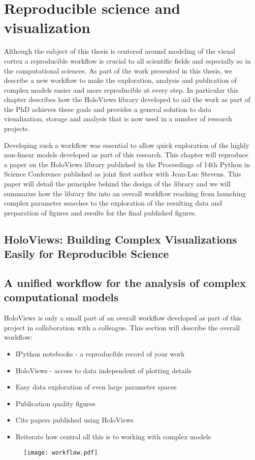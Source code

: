 \chapter{Reproducible science and visualization}

Although the subject of this thesis is centered around modeling of the
visual cortex a reproducible workflow is crucial to all scientific
fields and especially so in the computational sciences. As part of the
work presented in this thesis, we describe a new workflow to make the
exploration, analysis and publication of complex models easier and
more reproducible at every step. In particular this chapter describes
how the HoloViews library developed to aid the work as part of the PhD
achieves these goals and provides a general solution to data
visualization, storage and analysis that is now used in a number of
research projects.

Developing such a workflow was essential to allow quick exploration of
the highly non-linear models developed as part of this research.  This
chapter will reproduce a paper on the HoloViews library published in
the Proceedings of 14th Python in Science Conference published as
joint first author with Jean-Luc Stevens. This paper will detail the
principles behind the design of the library and we will summarize how
the library fits into an overall workflow reaching from launching
complex parameter searches to the exploration of the resulting data
and preparation of figures and results for the final published
figures.

\section{HoloViews: Building Complex Visualizations Easily for Reproducible Science}






\section{A unified workflow for the analysis of complex computational models}

HoloViews is only a small part of an overall workflow developed as
part of this project in collaboration with a colleague. This section
will describe the overall workflow:

\begin{itemize}
\item IPython notebooks - a reproducible record of your work
\item HoloViews - access to data independent of plotting details
\item Easy data exploration of even large parameter spaces
\item Publication quality figures
\item Cite papers published using HoloViews
\item Reiterate how central all this is to working with complex models
\end{itemize}

\begin{figure}
	\centering
        \texttt{[image: workflow.pdf]}
	\caption{}
	\label{workflow}
\end{figure}




